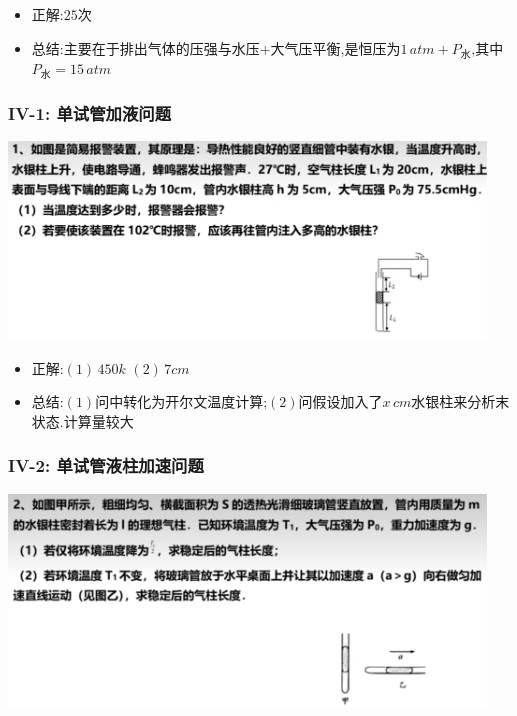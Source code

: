 \documentclass{article}
\begin{document}
\begin{itemize}
    \item 正解:\quad $25$次
    \item 总结:\quad 主要在于排出气体的压强与水压+大气压平衡,是恒压为$1 \, atm + P_{\text{水}}$,其中$P_{\text{水}} = 15 \, atm$
\end{itemize}

\vspace{2em}

\subsubsection{IV-1: 单试管加液问题}
\includegraphics[width = 0.95\textwidth,keepaspectratio]{./pictures/2.3-12.png}

\begin{itemize}
    \item 正解:\quad $(1) \, 450k$  $(2) \, 7cm$
    \item 总结:\quad $(1)$问中转化为开尔文温度计算;$(2)$问假设加入了$x \, cm$水银柱来分析末状态.计算量较大
\end{itemize}

\vspace{2em}

\subsubsection{IV-2: 单试管液柱加速问题}
\includegraphics[width = 0.95\textwidth,keepaspectratio]{./pictures/2.3-13.png}
\end{document}
